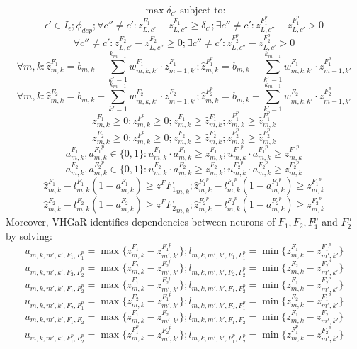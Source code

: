 $$\max{\delta_{c'}} \text{ subject to:}$$
$$ \epsilon'\in{I_\epsilon}; \phi_{dep}; \forall{c''}\neq{c'}: z^{F_1}_{L,c'}-z^{F_1}_{L,c''}\geq\delta_{c'}; \exists{c''}\neq{c'}: z^{F_1^p}_{L,c''}-z^{F_1^p}_{L,c'}>0$$
$$\forall{c''}\neq{c'}: z^{F_2}_{L,c'}-z^{F_2}_{L,c''}\geq{0}; \exists{c''}\neq{c'}: z^{F_2^p}_{L,c''}-z^{F_2^p}_{L,c'}>0$$
$$\forall{m,k}: \hat{z}^{F_1}_{m,k}=b_{m,k}+\sum_{k'=1}^{k_{m-1}} w^{F_1}_{m,k,k'}\cdot{z^{F_1}_{m-1,k'}}; \hat{z}^{F_1^p}_{m,k}=b_{m,k}+\sum_{k'=1}^{k_{m-1}} w^{F_1}_{m,k,k'}\cdot{z^{F_1^p}_{m-1,k'}}$$
$$\forall{m,k}: \hat{z}^{F_2}_{m,k}=b_{m,k}+\sum_{k'=1}^{k_{m-1}} w^{F_2}_{m,k,k'}\cdot{z^{F_2}_{m-1,k'}}; \hat{z}^{F_2^p}_{m,k}=b_{m,k}+\sum_{k'=1}^{k_{m-1}} w^{F_2}_{m,k,k'}\cdot{z^{F_2^p}_{m-1,k'}}$$
$$z^{F_1}_{m,k}\geq0; z^{F^p}_{m,k}\geq0; z^{F_1}_{m,k}\geq{\hat{z}^{F_1}_{m,k}}; z^{F_1^p}_{m,k}\geq{\hat{z}^{F_1^p}_{m,k}}$$
$$z^{F_2}_{m,k}\geq0; z^{F^p}_{m,k}\geq0; z^{F_2}_{m,k}\geq{\hat{z}^{F_2}_{m,k}}; z^{F_2^p}_{m,k}\geq{\hat{z}^{F_2^p}_{m,k}}$$
$$a^{F_1}_{m,k},a^{{F_1}^p}_{m,k}\in{\{0,1\}}: u^{F_1}_{m,k}\cdot{a^{F_1}_{m,k}}\geq{z^{F_1}_{m,k}}; u^{{F_1}^p}_{m,k}\cdot{a^{{F_1}^p}_{m,k}}\geq{z^{{F_1}^p}_{m,k}}$$
$$a^{F_2}_{m,k},a^{{F_2}^p}_{m,k}\in{\{0,1\}}: u^{F_2}_{m,k}\cdot{a^{F_2}_{m,k}}\geq{z^{F_2}_{m,k}}; u^{{F_2}^p}_{m,k}\cdot{a^{{F_2}^p}_{m,k}}\geq{z^{{F_2}^p}_{m,k}}$$
$$\hat{z}^{F_1}_{m,k}-l^{F_1}_{m,k}(1-a^{F_1}_{m,k})\geq{z^F{F_1}_{m,k}}; \hat{z}^{{F_1}^p}_{m,k}-l^{{F_1}^p}_{m,k}(1-a^{{F_1}^p}_{m,k})\geq{z^{{F_1}^p}_{m,k}}$$
$$\hat{z}^{F_2}_{m,k}-l^{F_2}_{m,k}(1-a^{F_2}_{m,k})\geq{z^F{F_2}_{m,k}}; \hat{z}^{{F_2}^p}_{m,k}-l^{{F_2}^p}_{m,k}(1-a^{{F_2}^p}_{m,k})\geq{z^{{F_2}^p}_{m,k}}$$
Moreover, VHGaR identifies dependencies between neurons of $F_1,F_2,F_1^p$ and $F_2^p$ by solving:
$$ u_{m,k,m',k',{F_1},{F_1^p}}=\max{\{z^{F_1}_{m,k}-z^{{F_1}^p}_{m',k'}\}} ; l_{m,k,m',k',{F_1},{F_1^p}}=\min{\{z^{F_1}_{m,k}-z^{{F_1}^p}_{m',k'}\}} $$
$$ u_{m,k,m',k',{F_2},{F_2^p}}=\max{\{z^{F_2}_{m,k}-z^{{F_2}^p}_{m',k'}\}} ; l_{m,k,m',k',{F_2},{F_2^p}}=\min{\{z^{F_2}_{m,k}-z^{{F_2}^p}_{m',k'}\}} $$
$$ u_{m,k,m',k',{F_1},{F_2^p}}=\max{\{z^{F_1}_{m,k}-z^{{F_2}^p}_{m',k'}\}} ; l_{m,k,m',k',{F_1},{F_2^p}}=\min{\{z^{F_1}_{m,k}-z^{{F_2}^p}_{m',k'}\}} $$
$$ u_{m,k,m',k',{F_2},{F_1^p}}=\max{\{z^{F_2}_{m,k}-z^{{F_1}^p}_{m',k'}\}} ; l_{m,k,m',k',{F_2},{F_1^p}}=\min{\{z^{F_2}_{m,k}-z^{{F_1}^p}_{m',k'}\}} $$
$$ u_{m,k,m',k',{F_1},{F_2}}=\max{\{z^{F_1}_{m,k}-z^{{F_2}}_{m',k'}\}} ; l_{m,k,m',k',{F_1},{F_2}}=\min{\{z^{F_1}_{m,k}-z^{{F_2}}_{m',k'}\}} $$
$$ u_{m,k,m',k',{F_1^p},{F_2^p}}=\max{\{z^{{F^p_1}}_{m,k}-z^{{F_2}^p}_{m',k'}\}} ; l_{m,k,m',k',{F_1^p},{F_2^p}}=\min{\{z^{{F^p_1}}_{m,k}-z^{{F_2}^p}_{m',k'}\}} $$

